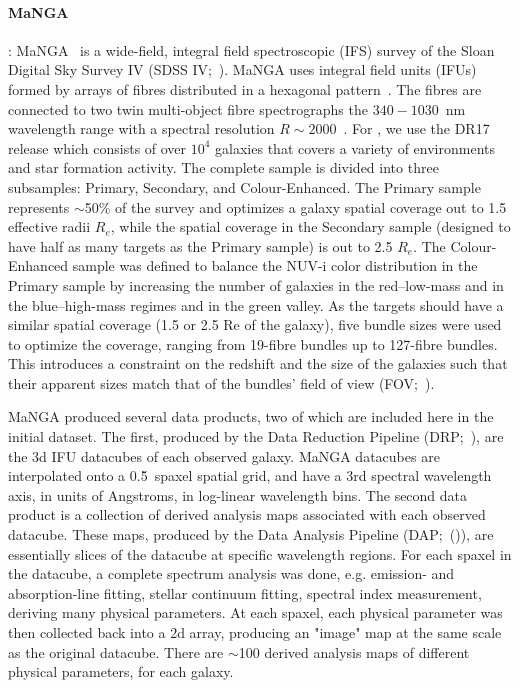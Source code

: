 \paragraph{MaNGA}: MaNGA~\citep{2015ApJ...798....7B} is a wide-field, integral field spectroscopic (IFS) survey of the Sloan Digital Sky Survey IV (SDSS IV;~\citealp{2017AJ....154...28B}). MaNGA uses integral field units (IFUs) formed by arrays of fibres distributed in a hexagonal pattern~\citep{2015AJ....149...77D}. The fibres are connected to two twin multi-object fibre spectrographs the $340−1030$~nm wavelength range with a spectral resolution
$R\sim2000$~\citep{2013AJ....146...32S}. For \pile, we use the DR17~\citep{2022ApJS..259...35A} release which consists of over $10^4$ galaxies that covers a variety of environments and star formation activity.  The complete sample is divided into three subsamples: Primary, Secondary, and Colour-Enhanced. The Primary sample represents $\sim$50\% of the survey and optimizes a galaxy spatial coverage out to 1.5 effective radii $R_e$, while the spatial coverage
in the Secondary sample (designed to have half as many targets
as the Primary sample) is out to 2.5 $R_e$. The Colour-Enhanced
sample was defined to balance the NUV-i color distribution
in the Primary sample by increasing the number of galaxies in
the red–low-mass and in the blue–high-mass regimes and in the
green valley. As the targets should have a similar spatial coverage (1.5 or 2.5 Re of the galaxy), five bundle sizes were used to optimize the coverage, ranging from 19-fibre bundles up to 127-fibre bundles. This introduces a constraint on the redshift and the size of the galaxies such that their apparent sizes match that of the bundles’ field of view (FOV;~\citealp{2015ApJ...798....7B}).  

MaNGA produced several data products, two of which are included here in the initial \pile dataset.  The first, produced by the Data Reduction Pipeline (DRP;~\citealp{2016AJ....152...83L}), are the 3d IFU datacubes of each observed galaxy.  MaNGA datacubes are interpolated onto a 0.5\"~spaxel spatial grid, and have a 3rd spectral wavelength axis, in units of Angstroms, in log-linear wavelength bins.  The second data product is a collection of derived analysis maps associated with each observed datacube.  These maps, produced by the Data Analysis Pipeline (DAP;~(\citealp{2019AJ....158..231W})), are essentially slices of the datacube at specific wavelength regions.  For each spaxel in the datacube, a complete spectrum analysis was done, e.g. emission- and absorption-line fitting, stellar continuum fitting, spectral index measurement, deriving many physical parameters.  At each spaxel, each physical parameter was then collected back into a 2d array, producing an "image" map at the same scale as the original datacube.  There are $\sim$100 derived analysis maps of different physical parameters, for each galaxy. 
 
